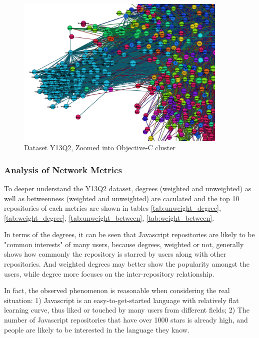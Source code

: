 \documentclass[11pt]{article}
\begin{document}
\begin{figure}[htp!]
  \begin{center}
    \includegraphics[width=0.9\textwidth]{Y13Q2_zoom.png}
  \end{center}
  \caption{Dataset Y13Q2, Zoomed into Objective-C cluster}
  \label{fig:zoom_2013}
\end{figure}



\subsubsection{Analysis of Network Metrics}
To deeper understand the Y13Q2 dataset, degrees (weighted and unweighted) as well as betweenness (weighted and unweighted) are caculated and the top 10 repositories of each metrics are shown in tables \ref{tab:unweight_degree}, \ref{tab:weight_degree}, \ref{tab:unweight_between}, \ref{tab:weight_between}.

In terms of the degrees, it can be seen that Javascript repositories are likely to be "common interests" of many users, because degrees, weighted or not, generally shows how commonly the repository is starred by users along with other repositories. And weighted degrees may better show the popularity amongst the users, while degree more focuses on the inter-repository relationship.

In fact, the observed phenomenon is reasonable when considering the real situation: 1) Javascript is an easy-to-get-started language with relatively flat learning curve, thus liked or touched by many users from different fields; 2) The number of Javascript repositories that have over 1000 stars is already high, and people are likely to be interested in the language they know.
\end{document}
